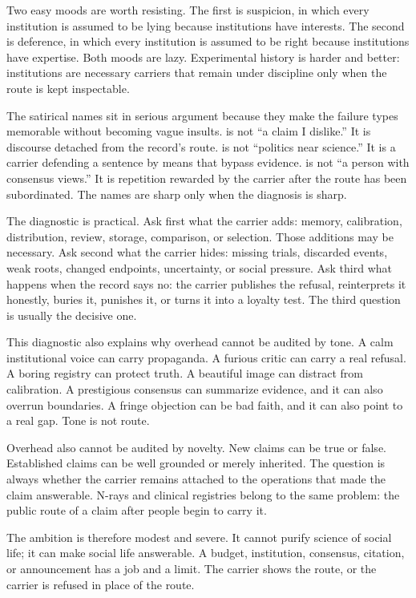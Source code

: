 \begin{chapteressay}
Two easy moods are worth resisting. The first is suspicion, in which every
institution is assumed to be lying because institutions have interests.
The second is deference, in which every institution is assumed to be
right because institutions have expertise. Both moods are lazy. Experimental history is harder and better:
institutions are necessary carriers that remain under discipline only
when the route is kept inspectable.

The satirical names sit in serious argument because they make the failure
types memorable without becoming vague insults.  is not
``a claim I dislike.'' It is discourse detached from the record's route.
 is not ``politics near science.'' It is a carrier
defending a sentence by means that bypass evidence.  is not
``a person with consensus views.'' It is repetition rewarded by the carrier
after the route has been subordinated. The names are sharp only when the
diagnosis is sharp.

The diagnostic is practical. Ask first what the carrier adds: memory,
calibration, distribution, review, storage, comparison, or selection.
Those additions may be necessary. Ask second what the carrier hides:
missing trials, discarded events, weak roots, changed endpoints,
uncertainty, or social pressure. Ask third what happens when the record
says no: the carrier publishes the refusal, reinterprets it honestly,
buries it, punishes it, or turns it into a loyalty test. The third
question is usually the decisive one.

This diagnostic also explains why overhead cannot be audited by tone. A
calm institutional voice can carry propaganda. A furious critic can carry
a real refusal. A boring registry can protect truth. A beautiful image
can distract from calibration. A prestigious consensus can summarize
evidence, and it can also overrun boundaries. A fringe objection can be
bad faith, and it can also point to a real gap. Tone is not route.

Overhead also cannot be audited by novelty. New claims can be true or
false. Established claims can be well grounded or merely inherited. The
question is always whether the carrier remains attached to the operations
that made the claim answerable. N-rays and clinical registries belong to the same problem: the public route
of a claim after people begin to carry it.

The ambition is therefore modest and severe. It cannot purify science of
social life; it can make social life answerable. A budget, institution,
consensus, citation, or announcement has a job and a limit. The carrier
shows the route, or the carrier is refused in place of the route.


\end{chapteressay}
